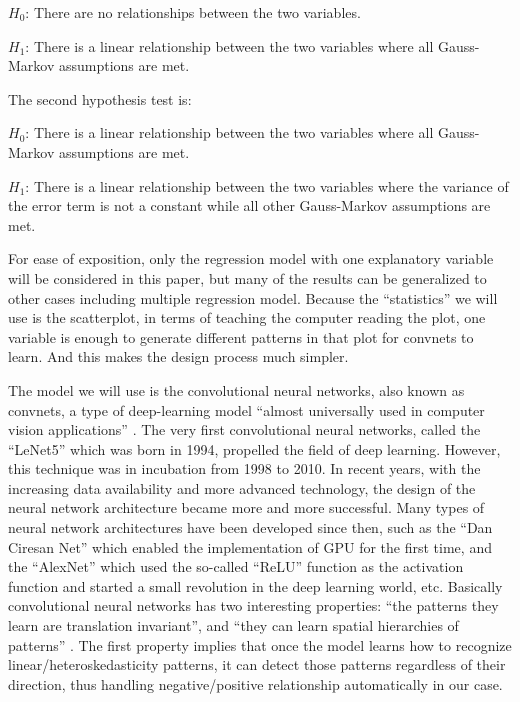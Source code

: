 \documentclass[12pt]{article}
\begin{document}
\(H_0\): There are no relationships between the two variables.

\(H_1\): There is a linear relationship between the two variables where
all Gauss-Markov assumptions are met.

The second hypothesis test is:

\(H_0\): There is a linear relationship between the two variables where
all Gauss-Markov assumptions are met.

\(H_1\): There is a linear relationship between the two variables where
the variance of the error term is not a constant while all other
Gauss-Markov assumptions are met.

For ease of exposition, only the regression model with one explanatory
variable will be considered in this paper, but many of the results can
be generalized to other cases including multiple regression model.
Because the ``statistics'' we will use is the scatterplot, in terms of
teaching the computer reading the plot, one variable is enough to
generate different patterns in that plot for convnets to learn. And this
makes the design process much simpler.

The model we will use is the convolutional neural networks, also known
as convnets, a type of deep-learning model ``almost universally used in
computer vision applications'' \citep{DLR18}. The very first
convolutional neural networks, called the ``LeNet5'' which was born in
1994, propelled the field of deep learning. However, this technique was
in incubation from 1998 to 2010. In recent years, with the increasing
data availability and more advanced technology, the design of the neural
network architecture became more and more successful. Many types of
neural network architectures have been developed since then, such as the
``Dan Ciresan Net'' which enabled the implementation of GPU for the
first time, and the ``AlexNet'' which used the so-called ``ReLU''
function as the activation function and started a small revolution in
the deep learning world, etc. \citep{cnn2017} Basically convolutional
neural networks has two interesting properties: ``the patterns they
learn are translation invariant'', and ``they can learn spatial
hierarchies of patterns'' \citep{DLR18}. The first property implies that
once the model learns how to recognize linear/heteroskedasticity
patterns, it can detect those patterns regardless of their direction,
thus handling negative/positive relationship automatically in our case.
\end{document}
